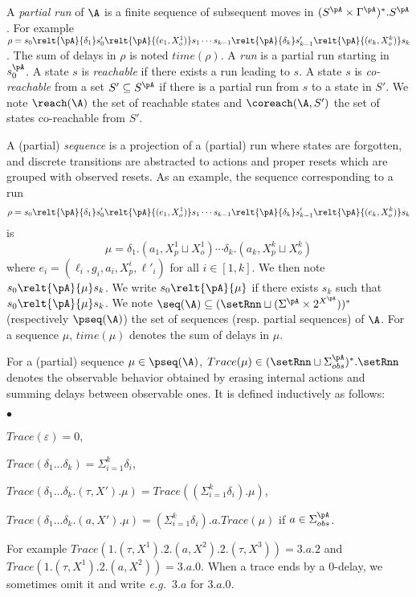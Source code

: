 \documentclass{LMCS}
\theoremstyle{plain}\newtheorem{proposition}[thm]{Proposition}
\def\eg{{\em e.g.}}
\begin{document}
A  {\it partial run} of $\A$ is a finite sequence of subsequent moves
in $(S^\pA \times \Gamma^\pA)^*.S^\pA$.
For example 
$\rho=s_0 \relt{\pA}{\delta_1} s'_0 \relt{\pA}{(e_1,X_o^1)} s_1\cdots
s_{k-1}\relt{\pA}{\delta_k} s'_{k-1} \relt{\pA}{(e_k,X_o^k)} s_k$. 
The sum of 
delays in $\rho$ is noted  $time(\rho)$. 
A {\em run} is a partial run starting in $s_0^\pA$.
A state $s$ is {\em reachable} if there exists a run leading to $s$. 
A  state $s$ is {\em co-reachable} from a set $S'\subseteq S^\pA$ if there is 
a partial run from $s$  to a state in $S'$.
We note $\reach(\A)$ the set of reachable states and 
$\coreach(\A,S')$ the set of states co-reachable  from $S'$.

A (partial) {\em sequence} is a projection of a (partial) run where
states are forgotten, and discrete transitions are abstracted to
actions and proper resets which are grouped with observed resets.  
As an example, the
sequence corresponding to a run 
\[\rho=s_0 \relt{\pA}{\delta_1} s'_0
\relt{\pA}{(e_1,X_o^1)} s_1\cdots s_{k-1}\relt{\pA}{\delta_k} s'_{k-1}
\relt{\pA}{(e_k,X_o^k)} s_k\]
 is \[\mu = \delta_1.(a_1,X_p^1 \sqcup
X_o^1)\cdots \delta_k.(a_k,X_p^k \sqcup X_o^k)\] where 
$e_i=(\ell_i,g_i,a_i,X^i_p,\ell'_i)$ for all $i \in
[1,k]$.  We then note $s_0\relt{\pA}{\mu} s_k$.  We write $s_0\relt{\pA}{\mu}$ 
if there exists
$s_k$ such that  $s_0\relt{\pA}{\mu} s_k$.  We note $\seq(\A)
\subseteq (\setRnn \sqcup (\Sigma^\pA \times 2^{X^\pA}))^*$
(respectively $\pseq(\A)$) the set of sequences (resp. partial
sequences) of $\A$. For a sequence $\mu$, $time(\mu)$
denotes the sum of delays in $\mu$.

For a (partial) sequence $\mu \in \pseq(\A)$, 
$Trace(\mu) \in (\setRnn \sqcup
\Sigma_{obs}^\pA)^*.\setRnn$ denotes the observable behavior obtained by erasing internal actions
and summing delays between observable ones. It is defined inductively as follows:
\begin{iteMize}{$\bullet$}
\item 
$Trace(\varepsilon) = 0$,
\item
$Trace(\delta_1\ldots \delta_k)=\Sigma_{i=1}^k \delta_i$,
\item 
$Trace(\delta_1\ldots \delta_k.(\tau,X').\mu)=
Trace ((\Sigma_{i=1}^k \delta_i).\mu)$,
\item 
$Trace(\delta_1\ldots \delta_k.(a,X').\mu)=
(\Sigma_{i=1}^k \delta_i).a.Trace(\mu)$ if $a\in \Sigma_{obs}^\pA$.
\end{iteMize}
For example $Trace(1.(\tau,X^1).2.(a,X^2). 2.(\tau,X^3))=3.a.2$ and
$Trace(1.(\tau,X^1).2.(a,X^2))=3.a.0$.  When a trace ends by a
$0$-delay, we sometimes omit it and write \eg~$3.a$ for $3.a.0$.
\end{document}
